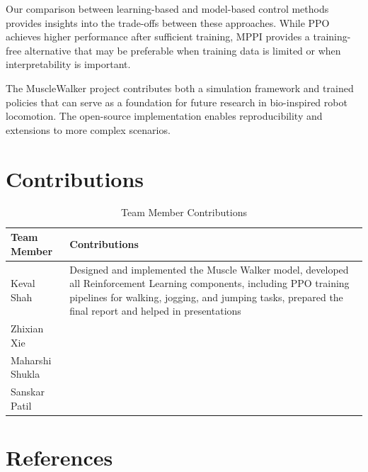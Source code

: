 \documentclass[conference]{IEEEtran}
\begin{document}
Our comparison between learning-based and model-based control methods provides insights into the trade-offs between these approaches. While PPO achieves higher performance after sufficient training, MPPI provides a training-free alternative that may be preferable when training data is limited or when interpretability is important.

The MuscleWalker project contributes both a simulation framework and trained policies that can serve as a foundation for future research in bio-inspired robot locomotion. The open-source implementation enables reproducibility and extensions to more complex scenarios.

\section{Contributions}

\begin{table}[h]
\centering
\caption{Team Member Contributions}
\begin{tabular}{lp{5cm}}
\toprule
\textbf{Team Member} & \textbf{Contributions} \\
\midrule
Keval Shah & Designed and implemented the Muscle Walker model, developed all Reinforcement Learning components, including PPO training pipelines for walking, jogging, and jumping tasks, prepared the final report and helped in presentations \\
Zhixian Xie & \\
Maharshi Shukla & \\
Sanskar Patil & \\
\bottomrule
\end{tabular}
\label{tab:contributions}
\end{table}

\section{References}
\end{document}
